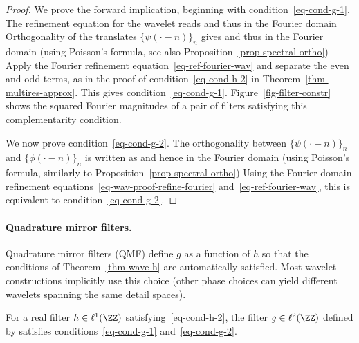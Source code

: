 \begin{proof}
We prove the forward implication, beginning with condition~\eqref{eq-cond-g-1}.
%
The refinement equation for the wavelet reads
and thus in the Fourier domain
Orthogonality of the translates $\{ \psi(\cdot-n) \}_n$ gives
and thus in the Fourier domain (using Poisson's formula, see also Proposition~\ref{prop-spectral-ortho})
Apply the Fourier refinement equation~\eqref{eq-ref-fourier-wav} and separate the even and odd terms, as in the proof of condition~\eqref{eq-cond-h-2} in Theorem~\ref{thm-multires-approx}. This gives condition~\eqref{eq-cond-g-1}.
%
Figure~\ref{fig-filter-constr} shows the squared Fourier magnitudes of a pair of filters satisfying this complementarity condition.



We now prove condition~\eqref{eq-cond-g-2}.
%
The orthogonality between $\{ \psi(\cdot-n) \}_n$ and $\{ \phi(\cdot-n) \}_n$ is written as
and hence in the Fourier domain (using Poisson's formula, similarly to Proposition~\ref{prop-spectral-ortho})
Using the Fourier domain refinement equations~\eqref{eq-wav-proof-refine-fourier} and~\eqref{eq-ref-fourier-wav}, this is equivalent to condition~\eqref{eq-cond-g-2}.
\end{proof}





\paragraph{Quadrature mirror filters.}

Quadrature mirror filters (QMF) define $g$ as a function of $h$ so that the conditions of Theorem~\ref{thm-wave-h} are automatically satisfied. Most wavelet constructions implicitly use this choice (other phase choices can yield different wavelets spanning the same detail spaces).

\begin{prop}
	For a real filter $h\in\ell^1(\ZZ)$ satisfying~\eqref{eq-cond-h-2}, the filter $g \in \ell^2(\ZZ)$ defined by
	satisfies conditions~\eqref{eq-cond-g-1} and~\eqref{eq-cond-g-2}.
\end{prop}

